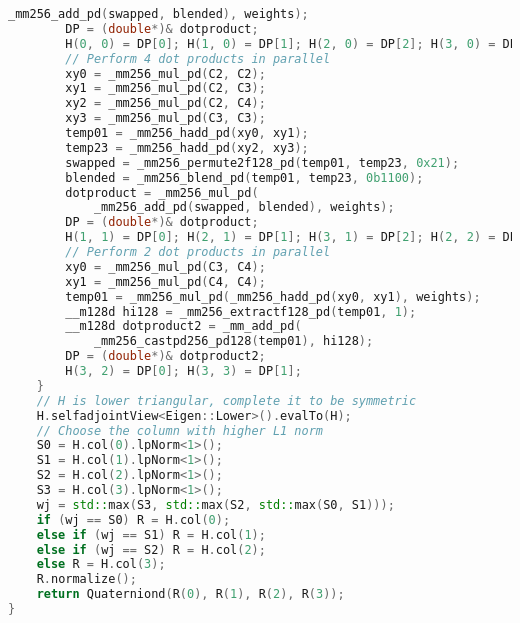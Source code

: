 \documentclass{birkjour}
\numberwithin{equation}{section}
\begin{document}
\begin{lstlisting}[language=C++, caption=C++ code for rotor estimation, basicstyle=\tiny, keywordstyle=\bfseries, label=lst:cppcode, morekeywords={Matrix4d,Vector4d,Vector3d,Quaterniond,sqrt,__m256d,__m128d}]
            _mm256_add_pd(swapped, blended), weights);
        DP = (double*)& dotproduct;
        H(0, 0) = DP[0]; H(1, 0) = DP[1]; H(2, 0) = DP[2]; H(3, 0) = DP[3];
        // Perform 4 dot products in parallel
        xy0 = _mm256_mul_pd(C2, C2);
        xy1 = _mm256_mul_pd(C2, C3);
        xy2 = _mm256_mul_pd(C2, C4);
        xy3 = _mm256_mul_pd(C3, C3);
        temp01 = _mm256_hadd_pd(xy0, xy1);
        temp23 = _mm256_hadd_pd(xy2, xy3);
        swapped = _mm256_permute2f128_pd(temp01, temp23, 0x21);
        blended = _mm256_blend_pd(temp01, temp23, 0b1100);
        dotproduct = _mm256_mul_pd(
            _mm256_add_pd(swapped, blended), weights);
        DP = (double*)& dotproduct;
        H(1, 1) = DP[0]; H(2, 1) = DP[1]; H(3, 1) = DP[2]; H(2, 2) = DP[3];
        // Perform 2 dot products in parallel
        xy0 = _mm256_mul_pd(C3, C4);
        xy1 = _mm256_mul_pd(C4, C4);
        temp01 = _mm256_mul_pd(_mm256_hadd_pd(xy0, xy1), weights);
        __m128d hi128 = _mm256_extractf128_pd(temp01, 1);
        __m128d dotproduct2 = _mm_add_pd(
            _mm256_castpd256_pd128(temp01), hi128);
        DP = (double*)& dotproduct2;
        H(3, 2) = DP[0]; H(3, 3) = DP[1];
    }
    // H is lower triangular, complete it to be symmetric
    H.selfadjointView<Eigen::Lower>().evalTo(H);
    // Choose the column with higher L1 norm
    S0 = H.col(0).lpNorm<1>();
    S1 = H.col(1).lpNorm<1>();
    S2 = H.col(2).lpNorm<1>();
    S3 = H.col(3).lpNorm<1>();
    wj = std::max(S3, std::max(S2, std::max(S0, S1)));
    if (wj == S0) R = H.col(0);
    else if (wj == S1) R = H.col(1);
    else if (wj == S2) R = H.col(2);
    else R = H.col(3);
    R.normalize();
    return Quaterniond(R(0), R(1), R(2), R(3));
}
\end{lstlisting}




\end{document}
